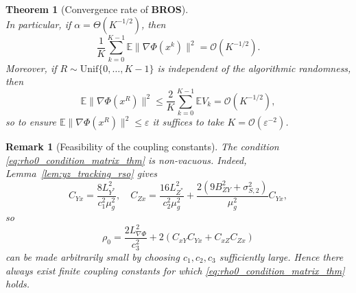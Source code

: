 \documentclass{pkumelon}
\theoremstyle{plain}
\newtheorem{theorem}{Theorem}
\newtheorem{remark}{Remark}
\newcommand{\E}{\mathbb{E}}
\newcommand{\Phiobj}{\Phi}
\newcommand{\oursname}{\textnormal{\textbf{BROS}}}
\newcommand{\ourslast}{\oursname}
\begin{document}
\begin{theorem}[Convergence rate of \ourslast]
\begin{equation}
\end{equation}
In particular, if $\alpha=\Theta(K^{-1/2})$, then
\begin{equation*}
\frac{1}{K}\sum_{k=0}^{K-1}\E\|\nabla\Phiobj(x^k)\|^2=\mathcal O(K^{-1/2}).
\end{equation*}
Moreover, if $R\sim\mathrm{Unif}\{0,\ldots,K-1\}$ is independent of the algorithmic randomness, then
\begin{equation}\label{eq:thm_rso_masoba_random_iterate}
\E\|\nabla\Phiobj(x^R)\|^2\le \frac{2}{K}\sum_{k=0}^{K-1}\E V_k=\mathcal O(K^{-1/2}),
\end{equation}
so to ensure $\E\|\nabla\Phiobj(x^R)\|^2\le \varepsilon$ it suffices to take $K=\mathcal O(\varepsilon^{-2})$.
\end{theorem}

\begin{remark}[Feasibility of the coupling constants]\label{rem:rho0_feasible}
The condition \eqref{eq:rho0_condition_matrix_thm} is non-vacuous. Indeed, Lemma~\ref{lem:yz_tracking_rso} gives
\begin{equation*}
C_{Yx}=\frac{8L_{Y^*}^2}{c_1^2\mu_g^2}, \quad C_{Zx}=\frac{16L_{Z^*}^2}{c_2^2\mu_g^2} +\frac{2(9B_{ZY}^2+\sigma_{S,2}^2)}{\mu_g^2}C_{Yx},
\end{equation*}
so
\begin{equation*}
\rho_0=\frac{2L_{\nabla\Phi}^2}{c_3^2}+2(C_{xY}C_{Yx}+C_{xZ}C_{Zx})
\end{equation*}
can be made arbitrarily small by choosing $c_1,c_2,c_3$ sufficiently large. Hence there always exist finite coupling constants for which \eqref{eq:rho0_condition_matrix_thm} holds.
\end{remark}
\end{document}
